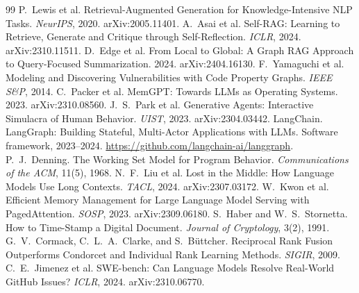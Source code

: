 \documentclass[11pt]{article}
\begin{document}
\begin{thebibliography}{99}
 P.~Lewis et al. Retrieval-Augmented Generation for
Knowledge-Intensive NLP Tasks. \emph{NeurIPS}, 2020. arXiv:2005.11401.
 A.~Asai et al. Self-RAG: Learning to Retrieve, Generate
and Critique through Self-Reflection. \emph{ICLR}, 2024. arXiv:2310.11511.
 D.~Edge et al. From Local to Global: A Graph RAG
Approach to Query-Focused Summarization. 2024. arXiv:2404.16130.
 F.~Yamaguchi et al. Modeling and Discovering
Vulnerabilities with Code Property Graphs. \emph{IEEE S\&P}, 2014.
 C.~Packer et al. MemGPT: Towards LLMs as Operating
Systems. 2023. arXiv:2310.08560.
 J.~S.~Park et al. Generative Agents: Interactive
Simulacra of Human Behavior. \emph{UIST}, 2023. arXiv:2304.03442.
 LangChain. LangGraph: Building Stateful, Multi-Actor
Applications with LLMs. Software framework, 2023--2024.
\url{https://github.com/langchain-ai/langgraph}.
 P.~J.~Denning. The Working Set Model for Program
Behavior. \emph{Communications of the ACM}, 11(5), 1968.
 N.~F.~Liu et al. Lost in the Middle: How Language Models Use
Long Contexts. \emph{TACL}, 2024. arXiv:2307.03172.
 W.~Kwon et al. Efficient Memory Management for Large
Language Model Serving with PagedAttention. \emph{SOSP}, 2023. arXiv:2309.06180.
 S.~Haber and W.~S.~Stornetta. How to Time-Stamp a
Digital Document. \emph{Journal of Cryptology}, 3(2), 1991.
 G.~V.~Cormack, C.~L.~A.~Clarke, and S.~B\"uttcher.
Reciprocal Rank Fusion Outperforms Condorcet and Individual Rank Learning Methods.
\emph{SIGIR}, 2009.
 C.~E.~Jimenez et al. SWE-bench: Can Language Models
Resolve Real-World GitHub Issues? \emph{ICLR}, 2024. arXiv:2310.06770.
\end{thebibliography}
\end{document}
